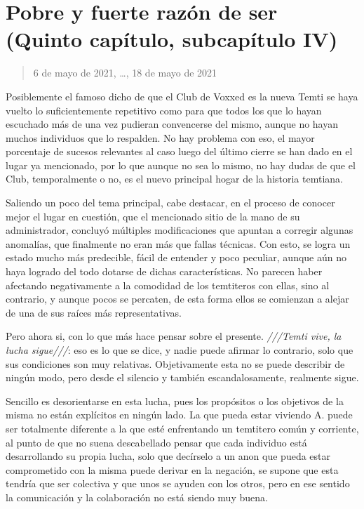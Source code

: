 \documentclass[
  spanish,
]{book}
\begin{document}
\hypertarget{pobre-y-fuerte-razuxf3n-de-ser-quinto-capuxedtulo-subcapuxedtulo-iv}{%
\section{Pobre y fuerte razón de ser (Quinto capítulo, subcapítulo IV)}\label{pobre-y-fuerte-razuxf3n-de-ser-quinto-capuxedtulo-subcapuxedtulo-iv}}

\begin{quote}
6 de mayo de 2021, \ldots, 18 de mayo de 2021
\end{quote}

Posiblemente el famoso dicho de que el Club de Voxxed es la nueva Temti se haya vuelto lo suficientemente repetitivo como para que todos los que lo hayan escuchado más de una vez pudieran convencerse del mismo, aunque no hayan muchos individuos que lo respalden. No hay problema con eso, el mayor porcentaje de sucesos relevantes al caso luego del último cierre se han dado en el lugar ya mencionado, por lo que aunque no sea lo mismo, no hay dudas de que el Club, temporalmente o no, es el nuevo principal hogar de la historia temtiana.

Saliendo un poco del tema principal, cabe destacar, en el proceso de conocer mejor el lugar en cuestión, que el mencionado sitio de la mano de su administrador, concluyó múltiples modificaciones que apuntan a corregir algunas anomalías, que finalmente no eran más que fallas técnicas. Con esto, se logra un estado mucho más predecible, fácil de entender y poco peculiar, aunque aún no haya logrado del todo dotarse de dichas características. No parecen haber afectando negativamente a la comodidad de los temtiteros con ellas, sino al contrario, y aunque pocos se percaten, de esta forma ellos se comienzan a alejar de una de sus raíces más representativas.

Pero ahora si, con lo que más hace pensar sobre el presente. \emph{///Temti vive, la lucha sigue///}: eso es lo que se dice, y nadie puede afirmar lo contrario, solo que sus condiciones son muy relativas. Objetivamente esta no se puede describir de ningún modo, pero desde el silencio y también escandalosamente, realmente sigue.

Sencillo es desorientarse en esta lucha, pues los propósitos o los objetivos de la misma no están explícitos en ningún lado. La que pueda estar viviendo A. puede ser totalmente diferente a la que esté enfrentando un temtitero común y corriente, al punto de que no suena descabellado pensar que cada individuo está desarrollando su propia lucha, solo que decírselo a un anon que pueda estar comprometido con la misma puede derivar en la negación, se supone que esta tendría que ser colectiva y que unos se ayuden con los otros, pero en ese sentido la comunicación y la colaboración no está siendo muy buena.
\end{document}
